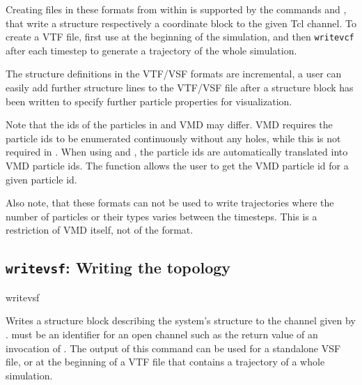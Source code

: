 Creating files in these formats from within \es is supported by the
commands  and , that write a structure
respectively a coordinate block to the given Tcl channel. To create a
VTF file, first use  at the beginning of the simulation,
and then \texttt{writevcf} after each timestep to generate a
trajectory of the whole simulation.

The structure definitions in the VTF/VSF formats are incremental, \ie
a user can easily add further structure lines to the VTF/VSF file
after a structure block has been written to specify further particle
properties for visualization.

Note that the ids of the particles in \es and VMD may differ. VMD
requires the particle ids to be enumerated continuously without any
holes, while this is not required in \es. When using 
and , the \es particle ids are automatically translated
into VMD particle ids. The function  allows the user to
get the VMD particle id for a given \es particle id.

Also note, that these formats can not be used to write trajectories
where the number of particles or their types varies between the
timesteps. This is a restriction of VMD itself, not of the format.

\subsection{\texttt{writevsf}: Writing the topology}

\begin{essyntax}
  writevsf  
\end{essyntax}
Writes a structure block describing the system's structure to the
channel given by .  must be an
identifier for an open channel such as the return value of an
invocation of .  The output of this command can be used
for a standalone VSF file, or at the beginning of a VTF file that
contains a trajectory of a whole simulation.

